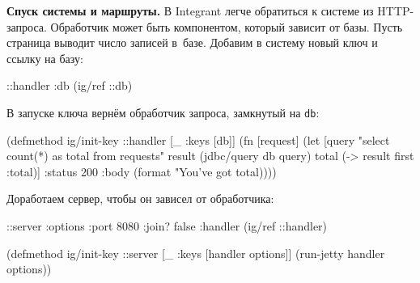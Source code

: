 
\textbf{Спуск системы и маршруты.} В Integrant легче обратиться к системе из
HTTP-запроса. Обработчик может быть компонентом, который зависит от базы. Пусть
страница выводит число записей в~базе. Добавим в систему новый ключ и ссылку на
базу:

\begin{english}
  \begin{clojure}
{::handler {:db (ig/ref ::db)}}
  \end{clojure}
\end{english}

\noindent
В запуске ключа вернём обработчик запроса, замкнутый на \verb|db|:

\ifx\DEVICETYPE\MOBILE

\begin{english}
  \begin{clojure}
(defmethod ig/init-key ::handler
  [_ {:keys [db]}]
  (fn [request]
    (let [query "select count(*) as total
                 from requests"
          result (jdbc/query db query)
          total (-> result first :total)]
      {:status 200
       :body (format
               "You've got %
               total)})))
  \end{clojure}
\end{english}

\else

\begin{english}
\end{english}

\fi

\noindent
Доработаем сервер, чтобы он зависел от обработчика:

\ifx\DEVICETYPE\MOBILE

\begin{english}
  \begin{clojure}
{::server {:options {:port 8080
                     :join? false}
           :handler (ig/ref ::handler)}}

(defmethod ig/init-key ::server
  [_ {:keys [handler options]}]
  (run-jetty handler options))
  \end{clojure}
\end{english}

